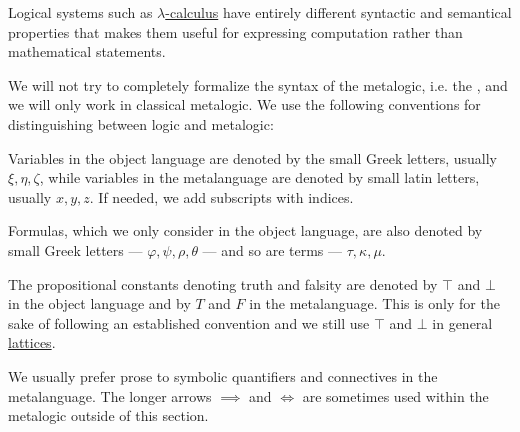 Logical systems such as \hyperref[subsec:lambda_calculus]{\( \lambda \)-calculus} have entirely different syntactic and semantical properties that makes them useful for expressing computation rather than mathematical statements.

\begin{remark}\label{rem:mathematical_logic_conventions}
  We will not try to completely formalize the syntax of the metalogic, i.e. the , and we will only work in classical metalogic. We use the following conventions for distinguishing between logic and metalogic:

  \begin{thmenum}
     Variables in the object language are denoted by the small Greek letters, usually \( \xi, \eta, \zeta \), while variables in the metalanguage are denoted by small latin letters, usually \( x, y, z \). If needed, we add subscripts with indices.

     Formulas, which we only consider in the object language, are also denoted by small Greek letters --- \( \varphi, \psi, \rho, \theta \) --- and so are terms --- \( \tau, \kappa, \mu \).

     The propositional constants denoting truth and falsity are denoted by \( \top \) and \( \bot \) in the object language and by \( T \) and \( F \) in the metalanguage. This is only for the sake of following an established convention and we still use \( \top \) and \( \bot \) in general \hyperref[def:lattice]{lattices}.

     We usually prefer prose to symbolic quantifiers and connectives in the metalanguage. The longer arrows \( \implies \) and \( \iff \) are sometimes used within the metalogic outside of this section.
  \end{thmenum}
\end{remark}
